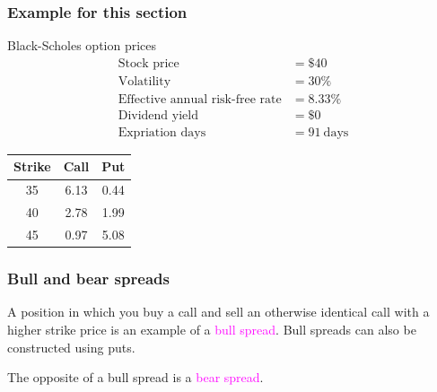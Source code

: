 \begin{frame}[fragile,t]
	\frametitle{Example for this section}
	\begin{center}
		Black-Scholes option prices \\
		\begin{align*}
			\text{Stock price}                     & = \$40   \\
			\text{Volatility}                      & = 30\%   \\
			\text{Effective annual risk-free rate} & = 8.33\% \\
			\text{Dividend yield} & = \$0 \\
			\text{Expriation days} & = 91~\text{days}
		\end{align*}

		\bigskip
		\renewcommand{\arraystretch}{1.2}
		\begin{tabular}{ccc}
			\hline
			Strike & Call & Put  \\
			\hline
			35     & 6.13 & 0.44 \\
			40     & 2.78 & 1.99 \\
			45     & 0.97 & 5.08 \\
		\end{tabular}
		\end{center}
\end{frame}
\begin{frame}[fragile,t]
	\frametitle{Bull and bear spreads}

	\bigskip
	A position in which you buy a call and sell  an otherwise identical call with a higher strike price
	is an example of a \textcolor{magenta}{bull spread}. Bull spreads can also be constructed using
	puts.

	\bigskip
	The opposite of a bull spread is a \textcolor{magenta}{bear spread}.

\end{frame}
